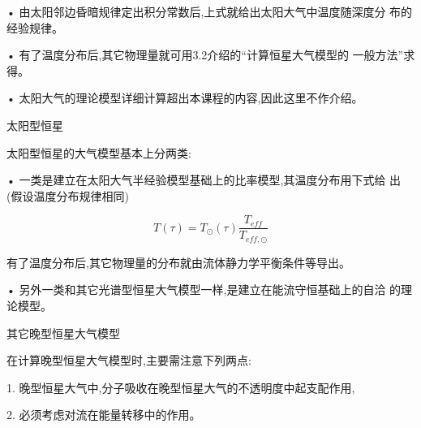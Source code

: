 \documentclass[UTF8]{article}
\begin{document}
\begin{fangsong}
• 由太阳邻边昏暗规律定出积分常数后,上式就给出太阳大气中温度随深度分
布的经验规律。

• 有了温度分布后,其它物理量就可用3.2介绍的“计算恒星大气模型的
一般方法”求得。

• 太阳大气的理论模型详细计算超出本课程的内容,因此这里不作介绍。

\noindent 太阳型恒星

太阳型恒星的大气模型基本上分两类:

• 一类是建立在太阳大气半经验模型基础上的比率模型,其温度分布用下式给
出(假设温度分布规律相同)

$$T ( \tau ) = T _ { \odot } ( \tau ) \frac { T _ { e f f } } { T _ { e f f , \odot } }$$

有了温度分布后,其它物理量的分布就由流体静力学平衡条件等导出。

• 另外一类和其它光谱型恒星大气模型一样,是建立在能流守恒基础上的自洽
的理论模型。

其它晚型恒星大气模型

在计算晚型恒星大气模型时,主要需注意下列两点:

1. 晚型恒星大气中,分子吸收在晚型恒星大气的不透明度中起支配作用,

2. 必须考虑对流在能量转移中的作用。
\end{fangsong}
\end{document}
